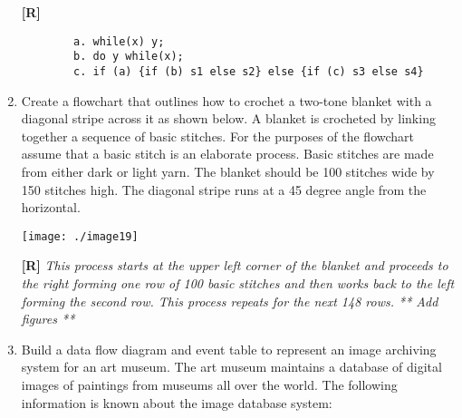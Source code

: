 \begin{enumerate}
    \begin{onlysolution}
      \textbf{[R]}
      \itshape
      \begin{verbatim}
        a. while(x) y;
        b. do y while(x);
        c. if (a) {if (b) s1 else s2} else {if (c) s3 else s4}
      \end{verbatim}
    \end{onlysolution}

\item
  Create a flowchart that outlines how to crochet a two-tone blanket
  with a diagonal stripe across it as shown below. A blanket is
  crocheted by linking together a sequence of basic stitches. For the
  purposes of the flowchart assume that a basic stitch is an elaborate
  process. Basic stitches are made from either dark or light yarn. The
  blanket should be 100 stitches wide by 150 stitches high. The diagonal
  stripe runs at a 45 degree angle from the horizontal.

  \texttt{[image: ./image19]}

  \begin{onlysolution}
    \textbf{[R]}
    \itshape
    This process starts at the upper left corner of the blanket and proceeds to 
    the right forming one row of 100 basic stitches and then works back to the left 
    forming the second row. This process repeats for the next 148 rows.
    ** Add figures **
  \end{onlysolution}


\item
  Build a data flow diagram and event table to represent an image
  archiving system for an art museum. The art museum maintains a
  database of digital images of paintings from museums all over the
  world. The following information is known about the image database
  system:


\end{enumerate}
